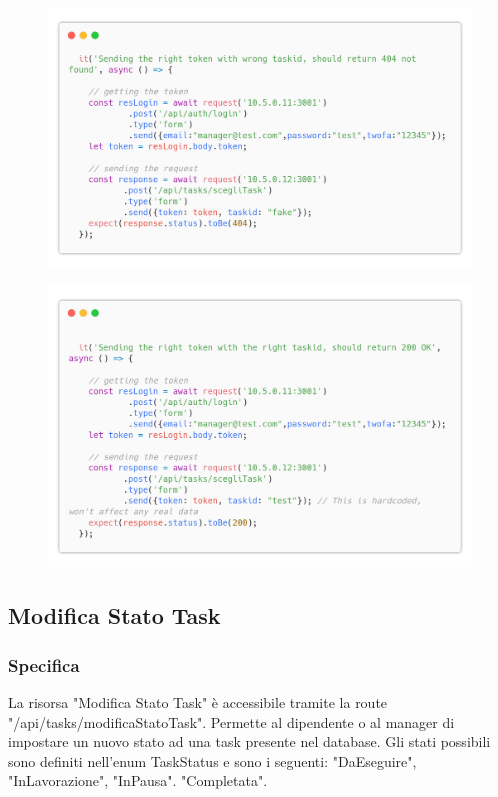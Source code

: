 \documentclass{report}
\begin{document}
\begin{figure}[H]
	\centering\includegraphics[width=1\textwidth]{images/code_scegli_task_test5.png}
\end{figure}
\begin{figure}[H]
	\centering\includegraphics[width=1\textwidth]{images/code_scegli_task_test6.png}
\end{figure}



\subsection{Modifica Stato Task}
\subsubsection*{Specifica}

La risorsa "Modifica Stato Task" è accessibile tramite la route "/api/tasks/modificaStatoTask". Permette al dipendente o al manager di impostare un nuovo stato ad una task presente nel database. Gli stati possibili sono definiti nell'enum TaskStatus e sono i seguenti: "DaEseguire", "InLavorazione", "InPausa". "Completata".
\end{document}
